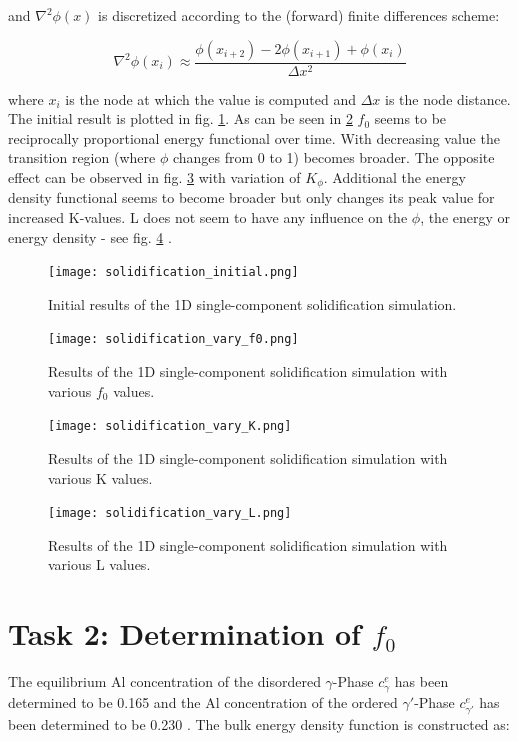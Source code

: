 and \(\nabla^{2} \phi(x) \) is discretized according to the (forward) finite differences scheme:

\begin{equation}
	\nabla^{2} \phi(x_{i}) \approx \frac{\phi(x_{i+2}) - 2\phi(x_{i+1}) + \phi(x_{i}) }{\Delta x^{2}} \label{eq:forward_euler_second_derivative}
\end{equation}

where \(x_{i}\) is the node at which the value is computed and \(\Delta x\) is the node distance. The initial result is plotted in fig. \ref{fig:solidification_init}. As can be seen in \ref{fig:solidification_f0} \(f_{0}\) seems to be reciprocally proportional energy functional over time. With decreasing value the transition region (where \(\phi\) changes from 0 to 1) becomes broader. The opposite effect can be observed in fig. \ref{fig:solidification_K} with variation of \(K_{\phi}\). Additional the energy density functional seems to become broader but only changes its peak value for increased K-values. L does not seem to have any influence on the \(\phi\), the energy or energy density - see fig. \ref{fig:solidification_L} .


\begin{figure}[htb]
	\centering
	\texttt{[image: solidification\_initial.png]}\label{fig:solidification_init}
	\caption{Initial results of the 1D single-component solidification simulation.}
\end{figure}

\begin{figure}[htb]
	\centering
	\texttt{[image: solidification\_vary\_f0.png]}\label{fig:solidification_f0}
	\caption{Results of the 1D single-component solidification simulation with various \(f_{0}\) values.}
\end{figure}

\begin{figure}[htb]
	\centering
	\texttt{[image: solidification\_vary\_K.png]}\label{fig:solidification_K}
	\caption{Results of the 1D single-component solidification simulation with various K values.}
\end{figure}


\begin{figure}[htb]
	\centering
	\texttt{[image: solidification\_vary\_L.png]}\label{fig:solidification_L}
	\caption{Results of the 1D single-component solidification simulation with various L values.}
\end{figure}

\section{Task 2: Determination of \(f_{0}\)}
The equilibrium Al concentration of the disordered \(\gamma \)-Phase \(c_{\gamma}^{e}\) has been determined to be 0.165 and the  Al concentration of the ordered \(\gamma ' \)-Phase \(c_{\gamma '}^{e}\) has been determined to be 0.230 \cite{zhu2002}. The bulk energy density function is constructed as:

